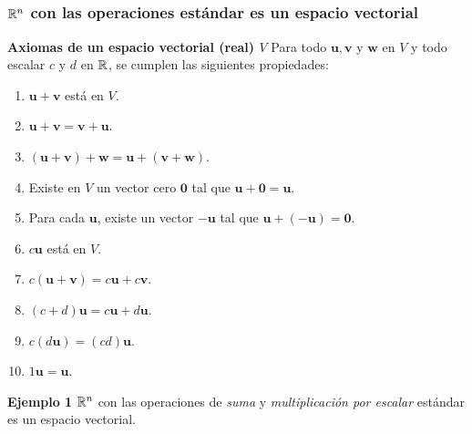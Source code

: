 
\subsection{}

{\nologo
\begin{frame}\frametitle{$\mathbb{R}^n$ con las operaciones estándar es un espacio vectorial}

\begin{block}{\textbf{Axiomas de un espacio vectorial (real) $V$}}	
	\justifying
	Para todo $\mathbf{u}, \mathbf{v}$ y $\mathbf{w}$ en $V$ y todo escalar $c$ y $d$ en $\mathbb{R}$, se 
	cumplen las siguientes propiedades: 
	
	\vspace{-3mm}
	\begin{multicols}{2}		
		\begin{enumerate}			
			\justifying
			\item $\mathbf{u}+\mathbf{v}$ está en $V$. %
			\item $\mathbf{u}+\mathbf{v} = \mathbf{v}+\mathbf{u}$. %
			\item $(\mathbf{u}+\mathbf{v})+\mathbf{w} = \mathbf{u}+(\mathbf{v}+\mathbf{w})$. %
			\item Existe en $V$ un vector cero $\mathbf{0}$ tal que $\mathbf{u}+\mathbf{0} = \mathbf{u}$.		
			\item Para cada $\mathbf{u}$, existe un vector $-\mathbf{u}$ tal que
			$ \mathbf{u}+(-\mathbf{u}) = \mathbf{0}$.
			\columnbreak
			\item $c\mathbf{u}$ está en $V$. 
			\item $c(\mathbf{u}+\mathbf{v}) = c\mathbf{u} + c\mathbf{v}$.
			\item $(c+d)\mathbf{u} = c\mathbf{u} + d\mathbf{u}$.
			\item $c(d\mathbf{u}) = (cd)\mathbf{u}$.
			\item $1\mathbf{u} = \mathbf{u}$.
		\end{enumerate}		
	\end{multicols}
	
	\vspace{-2mm}
\end{block}

\begin{ej}{\textbf{Ejemplo 1}}\justifying
	$\mathbb{R}^n$ con las operaciones de \textit{suma} y \textit{multiplicación por escalar} estándar es un espacio vectorial.
\end{ej}

\end{frame}
}

